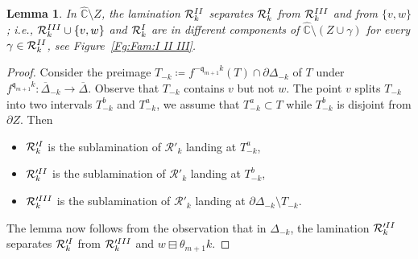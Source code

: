 \documentclass{amsart}
\newcommand{\1}{{\mathbb 1 }}
\newcommand\RR{\mathcal{R}}
\newcommand{\qq}{\mathfrak{q}}
\newcommand{\wC}{\widehat{\mathbb{C}}}
\newtheorem{lem}[thm]{Lemma}
\theoremstyle{remark}
\numberwithin{equation}{section}
\theoremstyle{definition}
\newcommand{\RN}[1]{\MakeUppercase{\romannumeral#1}}%
\begin{document}
\begin{lem}
\label{lem:3 Types}
In $\wC\setminus Z$, the lamination $\RR^{\RN{2}}_k$ separates $\RR^{\RN{1}}_k$ from $\RR^{\RN{3}}_k$ and from $\{v,w\}$; i.e., $\RR^{\RN{3}}_k\cup \{v,w\}$ and $\RR^{\RN{1}}_k$ are in different components of $\wC\setminus (Z\cup \gamma)$ for every $\gamma\in \RR^{\RN{2}}_k$, see Figure~\ref{Fg:Fam:I II III}.
\end{lem}
\begin{proof}
Consider the preimage $T_{-k} \coloneqq f^{-\qq_{m+1} k} (T) \cap \partial \Delta_{-k}$ of $T$ under ${f^{\qq_{m+1} k} \colon\overline \Delta_{-k} \to \overline \Delta}$. Observe that $T_{-k}$ contains $v$ but not $w$. The point $v$ splits $T_{-k}$ into two intervals $T^b_{-k}$ and $T^a_{-k}$, we assume that $T^a_{-k}\subset T$ while $T^b_{-k}$ is disjoint from $\partial Z$. Then \begin{itemize}
\item $\RR'^{\RN{1}}_k$ is the sublamination of $\RR'_k$ landing at $T^a_{-k}$,
\item $\RR'^{\RN{2}}_k$ is the sublamination of $\RR'_k$ landing at $T^b_{-k}$,
\item $\RR'^{\RN{3}}_k$ is the sublamination of $\RR'_k$ landing at $\partial \Delta_{-k}\setminus T_{-k}$.
\end{itemize}
The lemma now follows from the observation that in $\Delta_{-k}$, the lamination $\RR'^{\RN{2}}_k$ separates $\RR'^{\RN{1}}_k$ from $\RR'^{\RN{3}}_k$ and $w\boxminus \theta_{m+1}k$.
\end{proof}
\end{document}
